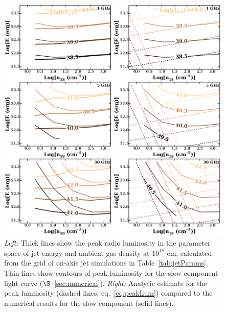 \documentclass[usenatbib,fleqn]{mnras}
\begin{document}
\begin{figure}
  \includegraphics[width=16cm]{lp_contours_new.pdf}
  \caption{\label{fig:jetContours} {\it {Left:}} Thick lines show the
    peak radio luminosity in the parameter space of jet energy and
    ambient gas density at $10^{18}$ cm, calculated from the grid of
    on-axis jet simulations in Table~\ref{tab:jetParams}. Thin lines
    show contours of peak luminosity for the slow component light
    curve ($\S$~\ref{sec:numerical}). {\it Right:} Analytic estimate
    for the peak luminosity (dashed lines; eq.~\ref{eq:peakLum})
    compared to the numerical results for the slow component (solid
    lines).}
\end{figure}
\end{document}
